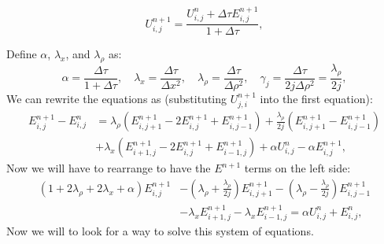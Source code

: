 \documentclass{article}
\begin{document}
\begin{equation}
U^{n+1}_{i,j} = \frac{U^{n}_{i,j} + \Delta \tau E^{n+1}_{i,j}}{1 + \Delta \tau},
\end{equation}

Define $\alpha$, $\lambda_x$, and $\lambda_\rho$ as:
\begin{equation}
\alpha = \frac{\Delta \tau}{1+\Delta \tau}, \quad \lambda_x = \frac{\Delta \tau}{\Delta x^2}, 
\quad \lambda_{\rho} = \frac{\Delta \tau}{\Delta \rho^2}, \quad \gamma_j = \frac{\Delta \tau}{2j\Delta \rho^2} = \frac{\lambda_{\rho}}{2j},
\end{equation}
We can rewrite the equations as (substituting $U^{n+1}_{j,i}$ into the first equation):
\begin{equation}
\begin{split}
E^{n+1}_{i,j}-E^{n}_{i,j} & = \lambda_{\rho}(E^{n+1}_{i,j+1}-2E^{n+1}_{i,j}+E^{n+1}_{i,j-1}) 
 + \frac{\lambda_{\rho}}{2j}(E^{n+1}_{i,j+1}-E^{n+1}_{i,j-1}) \\
& + \lambda_x({E^{n+1}_{i+1,j}-2E^{n+1}_{i,j}+E^{n+1}_{i-1,j}}) + \alpha U^{n}_{i,j} -\alpha E^{n+1}_{i,j},
\end{split}
\end{equation}
Now we will have to rearrange to have the $E^{n+1}$ terms on the left side:
\begin{equation}
\begin{split}
(1 + 2\lambda_{\rho} + 2\lambda_x + \alpha)E^{n+1}_{i,j} & - (\lambda_{\rho} + \frac{\lambda_{\rho}}{2j})E^{n+1}_{i,j+1} - (\lambda_{\rho} - \frac{\lambda_{\rho}}{2j})E^{n+1}_{i,j-1} \\
& - \lambda_x E^{n+1}_{i+1,j} - \lambda_x E^{n+1}_{i-1,j} = \alpha U^{n}_{i,j} + E^{n}_{i,j},
\end{split}
\end{equation}
Now we will to look for a way to solve this system of equations.
\end{document}
